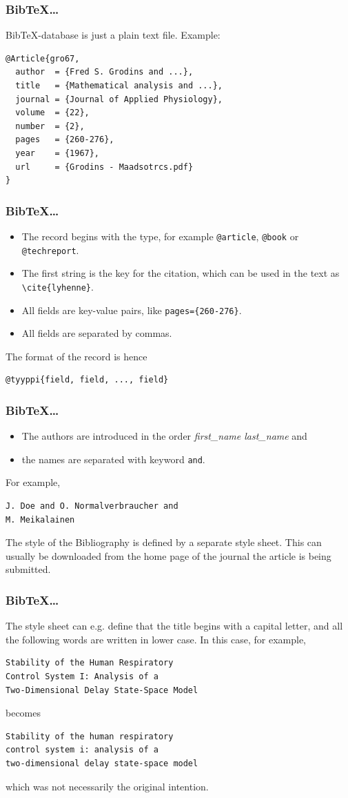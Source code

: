 \documentclass[13pt]{beamer}
\begin{document}
\begin{frame}[fragile]\frametitle{BibTeX\dots}
BibTeX-database is just a plain text file. Example:
\begin{verbatim}
@Article{gro67,
  author  = {Fred S. Grodins and ...},
  title   = {Mathematical analysis and ...},
  journal = {Journal of Applied Physiology},
  volume  = {22},
  number  = {2},
  pages   = {260-276},
  year    = {1967},
  url     = {Grodins - Maadsotrcs.pdf}
}
\end{verbatim}
\end{frame}


\begin{frame}[fragile]\frametitle{BibTeX\dots}
\begin{itemize}
\item The record begins with the type, for example \verb|@article|,
  \verb|@book| or \verb|@techreport|.
\item The first string is the key for the citation, which can be used in the
text as \verb|\cite{lyhenne}|.
\item All fields are key-value pairs, like \verb|pages={260-276}|.
\item All fields are separated by commas.
\end{itemize}
The format of the record is hence
\begin{verbatim}
@tyyppi{field, field, ..., field}
\end{verbatim}
\end{frame}


\begin{frame}[fragile]\frametitle{BibTeX\dots}
\begin{itemize}
\item The authors are introduced in the order \emph{first\_name last\_name} and
\item the names are separated with keyword \texttt{and}.
\end{itemize}
For example, 
\begin{verbatim}
J. Doe and O. Normalverbraucher and 
M. Meikalainen
\end{verbatim}\medskip
\begin{flushleft}
The style of the Bibliography is defined by a separate style sheet. This can
usually be downloaded from the home page of the journal the article is being
submitted.
\end{flushleft}
\end{frame}


\begin{frame}[fragile]\frametitle{BibTeX\dots}
The style sheet can e.g. define that the title begins with a capital letter, and
all the following words are written in lower case. In this case, for example, 
\begin{verbatim}
Stability of the Human Respiratory 
Control System I: Analysis of a 
Two-Dimensional Delay State-Space Model
\end{verbatim}
becomes
\begin{verbatim}
Stability of the human respiratory 
control system i: analysis of a 
two-dimensional delay state-space model
\end{verbatim}
which was not necessarily the original intention.
\end{frame}
\end{document}
